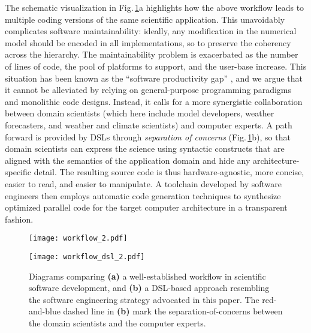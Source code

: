 \documentclass[../main.tex]{subfiles}
\begin{document}
        The schematic visualization in Fig.\,\ref{fig:dsl}a highlights how the above workflow leads to multiple coding versions of the same scientific application. This unavoidably complicates software maintainability: ideally, any modification in the numerical model should be encoded in all implementations, so to preserve the coherency across the hierarchy. The maintainability problem is exacerbated as the number of lines of code, the pool of platforms to support, and the user-base increase. This situation has been known as the ``software productivity gap'' \citep{lawrence18}, and we argue that it cannot be alleviated by relying on general-purpose programming paradigms and monolithic code designs. Instead, it calls for a more synergistic collaboration between domain scientists (which here include model developers, weather forecasters, and weather and climate scientists) and computer experts. A path forward is provided by DSLs through \emph{separation of concerns} (Fig.\,\ref{fig:dsl}b), so that domain scientists can express the science using syntactic constructs that are aligned with the semantics of the application domain and hide any architecture-specific detail. The resulting source code is thus hardware-agnostic, more concise, easier to read, and easier to manipulate. A toolchain developed by software engineers then employs automatic code generation techniques to synthesize optimized parallel code for the target computer architecture in a transparent fashion.

        \begin{figure}[t!]
            \centering

            \begin{minipage}{0.495\textwidth}
                \centering
                \texttt{[image: workflow\_2.pdf]}
            \end{minipage}
            \begin{minipage}{0.495\textwidth}
                \centering
                \texttt{[image: workflow\_dsl\_2.pdf]}
            \end{minipage}

            \caption{Diagrams comparing \textbf{(a)} a well-established workflow in scientific software development, and \textbf{(b)} a DSL-based approach resembling the software engineering strategy advocated in this paper. The red-and-blue dashed line in \textbf{(b)} mark the separation-of-concerns between the domain scientists and the computer experts.}
            \label{fig:dsl}
        \end{figure}
\end{document}
